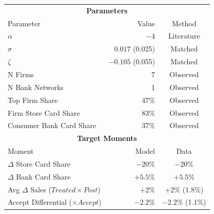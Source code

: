 \begin{tabular}{lrc}
\multicolumn{3}{c}{\textbf{Parameters}} \\
Parameter & Value & Method \\
\hline
$\alpha$ & $-4$ & Literature \\
$\sigma$ & $0.017$ (0.025) & Matched \\
$\zeta$ & $-0.105$ (0.055) & Matched \\
N Firms & 7 & Observed\\
N Bank Networks & 1 & Observed\\
Top Firm Share & 47\% & Observed\\
Firm Store Card Share & 83\% & Observed\\
Consumer Bank Card Share & 37\% & Observed
\\ \multicolumn{3}{c}{\textbf{Target Moments}} \\
Moment & Model & Data \\
\hline
$\Delta$ Store Card Share & $-20\%$ & $-20\%$ \\
$\Delta$ Bank Card Share & $+5.5\%$ & $+5.5\%$ \\
Avg $\Delta$ Sales ($Treated\times Post$) & $+2\%$ & $+2\%$ (1.8\%) \\
Accept Differential ($\times Accept$) & $-2.2\%$ & $-2.2\%$ (1.1\%)
\end{tabular}
